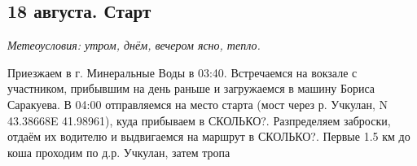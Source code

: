 \subsection{18 августа. Старт}
\textit{Метеоусловия: утром, днём, вечером ясно, тепло.}

Приезжаем в г. Минеральные Воды в 03:40. Встречаемся на вокзале с участником, прибывшим на день раньше и загружаемся в машину Бориса Саракуева. В 04:00 отправляемся на место старта (мост через р. Учкулан, N 43.38668\degree E 41.98961\degree), куда прибываем в \alert{СКОЛЬКО?}. Разпределяем заброски, отдаём их водителю и выдвигаемся на маршрут в \alert{СКОЛЬКО?}. Первые 1.5 км до коша проходим по д.р. Учкулан, затем тропа

\newpage